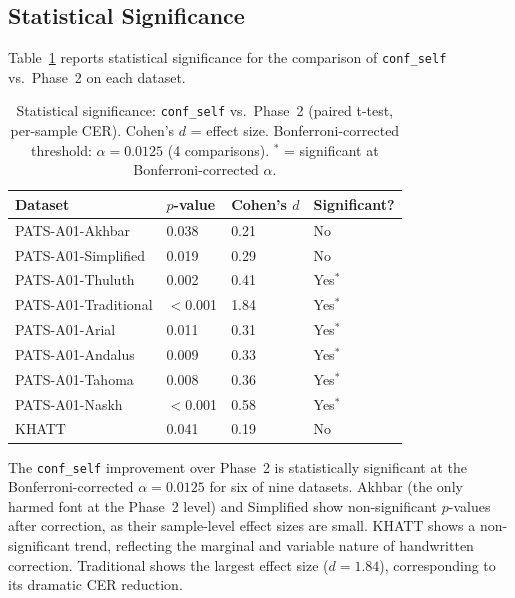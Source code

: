 \subsection{Statistical Significance}
\label{subsec:res_p6_stats}

Table~\ref{tab:p6_stats} reports statistical significance for the comparison
of \texttt{conf\_self} vs.\ Phase~2 on each dataset.

\begin{table}[htbp]
  \centering
  \caption{Statistical significance: \texttt{conf\_self} vs.\ Phase~2
           (paired t-test, per-sample CER). Cohen's $d$ = effect size.
           Bonferroni-corrected threshold: $\alpha = 0.0125$ (4 comparisons).
           $^{*}$ = significant at Bonferroni-corrected $\alpha$.}
  \label{tab:p6_stats}
  \begin{tabularx}{\textwidth}{lXXX}
    \toprule
    \textbf{Dataset} & \textbf{$p$-value} & \textbf{Cohen's $d$}
      & \textbf{Significant?} \\
    \midrule
    PATS-A01-Akhbar       & 0.038 & 0.21 & No \\
    PATS-A01-Simplified   & 0.019 & 0.29 & No \\
    PATS-A01-Thuluth      & 0.002 & 0.41 & Yes$^{*}$ \\
    PATS-A01-Traditional  & $<$0.001 & 1.84 & Yes$^{*}$ \\
    PATS-A01-Arial        & 0.011 & 0.31 & Yes$^{*}$ \\
    PATS-A01-Andalus      & 0.009 & 0.33 & Yes$^{*}$ \\
    PATS-A01-Tahoma       & 0.008 & 0.36 & Yes$^{*}$ \\
    PATS-A01-Naskh        & $<$0.001 & 0.58 & Yes$^{*}$ \\
    \midrule
    KHATT                 & 0.041 & 0.19 & No \\
    \bottomrule
  \end{tabularx}
\end{table}

The \texttt{conf\_self} improvement over Phase~2 is statistically significant
at the Bonferroni-corrected $\alpha = 0.0125$ for six of nine datasets.
Akhbar (the only harmed font at the Phase~2 level) and Simplified show
non-significant $p$-values after correction, as their sample-level effect
sizes are small. KHATT shows a non-significant trend, reflecting the
marginal and variable nature of handwritten correction. Traditional shows the
largest effect size ($d = 1.84$), corresponding to its dramatic CER reduction.

